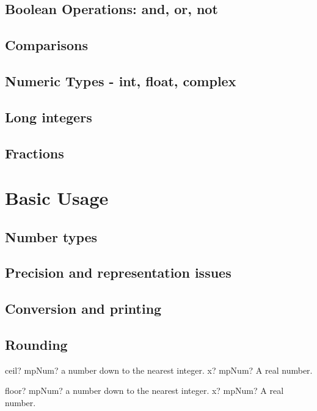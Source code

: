 \documentclass[12pt,a4paper,openany]{book}
\begin{document}
\section{Boolean Operations: and, or, not}

\section{Comparisons}

\section{Numeric Types - int, float, complex}

\section{Long integers}

\section{Fractions}

\chapter{Basic Usage}

\section{Number types}

\section{Precision and representation issues}

\section{Conversion and printing}

\section{Rounding}

\begin{mpFunctionsExtract}
\mpFunctionOne
{ceil? mpNum?  a number down to the nearest integer.}
{x? mpNum? A real number.}
\end{mpFunctionsExtract}

\begin{mpFunctionsExtract}
\mpFunctionOne
{floor? mpNum?  a number down to the nearest integer.}
{x? mpNum? A real number.}
\end{mpFunctionsExtract}
\end{document}
